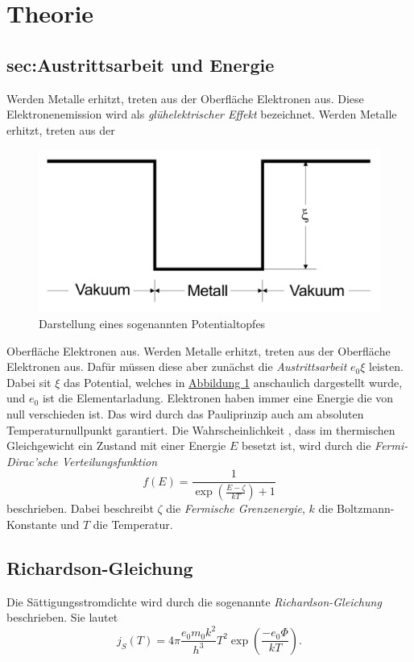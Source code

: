 \section{Theorie}
\label{sec:Theorie}

\subsection{sec:Austrittsarbeit und Energie}
\label{sec:Austrittsarbeit und Energie}
Werden Metalle erhitzt, treten aus der Oberfläche Elektronen aus.
Diese Elektronenemission wird als \textit{glühelektrischer Effekt} bezeichnet.
Werden Metalle erhitzt, treten aus der
\begin{figure}
    \caption{Darstellung eines sogenannten Potentialtopfes}\label{fig:Potentialtopf}
    \includegraphics[width=\linewidth]{pictures/Potentialtopf.pdf}
\end{figure} 
Oberfläche Elektronen aus.
Werden Metalle erhitzt, treten aus der Oberfläche Elektronen aus.
Dafür müssen diese aber zunächst die \textit{Austrittsarbeit} $e_0 \xi$ leisten.
Dabei sit $\xi$ das Potential, welches in \hyperref[fig:Potentialtopf]{Abbildung \ref{fig:Potentialtopf}} anschaulich dargestellt wurde, und
$e_0$ ist die Elementarladung.
Elektronen haben immer eine Energie die von null verschieden ist.
Das wird durch das Pauliprinzip auch am absoluten Temperaturnullpunkt garantiert.
Die Wahrscheinlichkeit , dass im thermischen Gleichgewicht ein Zustand mit einer Energie $E$ besetzt ist, wird durch die
\textit{Fermi-Dirac'sche Verteilungsfunktion}
\begin{equation}
    f(E)=\frac{1}{\exp \left(\frac{E-\zeta}{k T}\right)+1}
\end{equation}
beschrieben. Dabei beschreibt $\zeta$ die \textit{Fermische Grenzenergie}, $k$ die Boltzmann-Konstante und $T$ die Temperatur.

\subsection{Richardson-Gleichung}
\label{eq:Richardson}
Die Sättigungsstromdichte wird durch die sogenannte \textit{Richardson-Gleichung} \cite{v504} beschrieben. Sie lautet
\begin{equation}
    j_{S}(T)=4 \pi \frac{e_{0} m_{0} k^{2}}{h^{3}} T^{2} \exp \left(\frac{-e_{0} \Phi}{k T}\right) .
\end{equation}
